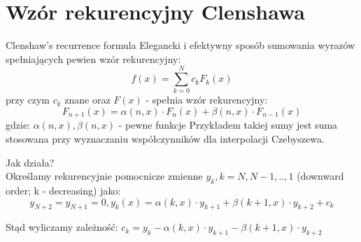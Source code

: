 \section{Wzór rekurencyjny Clenshawa}
\begin{frame}{Clenshaw's recurrence formula}
	Elegancki i efektywny sposób sumowania wyrazów spełniających pewien wzór rekurencyjny:
    $$f(x) = \sum_{k=0}^{N}c_kF_k(x)$$
    przy czym $c_k$ znane oraz $F(x)$ - spełnia wzór rekurencyjny:
    $$F_{n+1}(x) = \alpha(n,x) \cdot F_n(x) + \beta(n,x) \cdot F_{n-1}(x)$$
   gdzie: $\alpha(n,x),\beta(n,x)$ - pewne funkcje\newline
   Przykładem takiej sumy jest suma stosowana przy wyznaczaniu współczynników dla interpolacji Czebyszewa.
\end{frame}
\begin{frame}
Jak działa?\\

    Określamy rekurencyjnie  pomocnicze zmienne $y_k,k = N,N-1,..,1$ (downward order; k - decreasing) jako:
    $$y_{N+2}=y_{N+1} = 0, y_k(x) = \alpha(k,x) \cdot y_{k+1}+\beta(k+1,x) \cdot y_{k+2}+c_k$$
    
    Stąd wyliczamy zależność: $c_k = y_k - \alpha(k,x) \cdot y_{k+1} - \beta(k+1,x) \cdot y_{k+2}$ \newline
\end{frame} 
